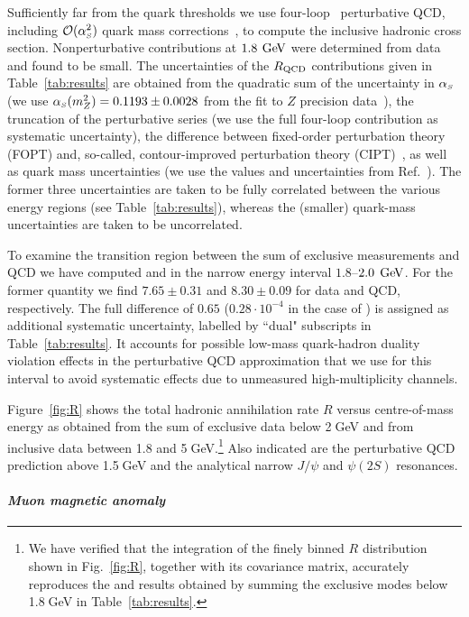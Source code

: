 Sufficiently far from the quark thresholds we use four-loop~\cite{baikov} perturbative QCD, including ${\cal O}(\as^2)$ quark mass corrections~\cite{kuhnmass}, to compute the inclusive hadronic cross section. Nonperturbative contributions at $1.8\:\mathrm{\,Ge\kern -0.1em V}$ were determined from data~\cite{dh98} and found to be small. The uncertainties of the $R_{\rm QCD}$ contributions given in Table~\ref{tab:results} are obtained from the quadratic sum of the uncertainty in $\alpha_{\scriptscriptstyle S}$  (we use $\alpha_{\scriptscriptstyle S}(m_Z^2)=0.1193\pm0.0028$ from the fit to  $Z$ precision data~\cite{gfitter}), the truncation of the perturbative series (we use the full four-loop contribution as systematic uncertainty), the  difference between fixed-order perturbation theory  (FOPT) and, so-called, contour-improved perturbation theory (CIPT)~\cite{ledibpich}, as well as quark mass uncertainties (we use the values and uncertainties from Ref.~\cite{pdg}). The former three uncertainties are taken to be fully correlated between the various energy regions (see Table~\ref{tab:results}), whereas the (smaller) quark-mass uncertainties are taken to be uncorrelated. 

To examine the transition region between the sum of exclusive measurements and QCD we have computed \amuhadLO and \dahadZ in the narrow energy interval $1.8$--$2.0\;\mathrm{\,Ge\kern -0.1em V}$. For the former quantity we find $7.65  \pm 0.31$ and $8.30 \pm 0.09$ for data and QCD, respectively. The full difference of $0.65$ ($0.28\cdot10^{-4}$ in the case of \dahadZ) is assigned as additional systematic uncertainty, labelled by ``dual" subscripts in Table~\ref{tab:results}. It accounts for possible low-mass quark-hadron duality violation effects in the perturbative QCD approximation that we use for this interval to avoid systematic effects due to  unmeasured high-multiplicity channels. 

Figure~\ref{fig:R} shows the total hadronic \ee annihilation rate $R$ versus centre-of-mass energy as obtained from the sum of exclusive data below 2$\;$GeV and from inclusive data between 1.8 and 5$\;$GeV.\footnote{We have verified that the integration of the finely binned $R$ distribution shown in Fig.~\ref{fig:R}, together with its covariance matrix, accurately reproduces the \amuhadLO and \dahadZ results obtained by summing the exclusive modes below 1.8$\;$GeV  in Table~\ref{tab:results}.} Also indicated are the perturbative QCD prediction above 1.5$\;$GeV and the analytical narrow $J/\psi$ and $\psi(2S)$ resonances.

\vspace{0.0cm}
\paragraph*{\bf\em Muon magnetic anomaly\\[0.2cm] } 

